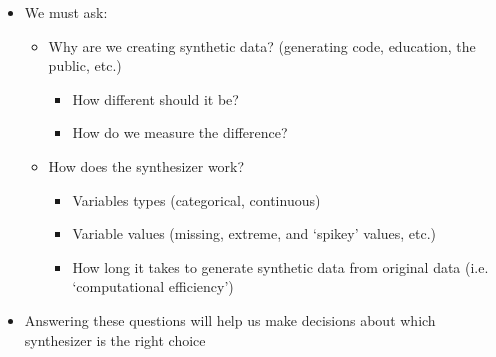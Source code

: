\documentclass[t,8pt,utfx8]{beamer}
\begin{document}
\begin{spacing}{1.25}
{\begin{itemize}
    \item We must ask: 
    \begin{itemize}
        \item Why are we creating synthetic data?  (generating code, education, the public, etc.)
        \begin{itemize}
            \item How different should it be?  
            \item How do we measure the difference? 
        \end{itemize}
        \item How does the synthesizer work? 
        \begin{itemize}
            \item Variables types (categorical, continuous)
            \item Variable values (missing, extreme, and `spikey' values, etc.)
            \item How long it takes to generate synthetic data from original data (i.e. `computational efficiency')
        \end{itemize}
    \end{itemize}
    \item Answering these questions will help us make decisions about which synthesizer is the right choice
\end{itemize}
}





\end{spacing}
\end{document}
